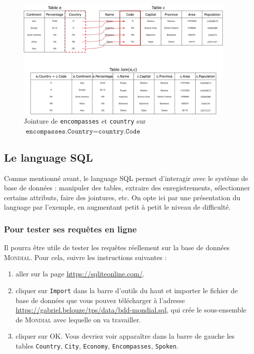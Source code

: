 \begin{figure}[h]
	\begin{center}
		\includegraphics[width=0.95\textwidth]{figures/12/bddr-mondial.png}
	\end{center}
	\caption{Jointure de \texttt{encompasses} et \texttt{country} sur $ \texttt{encompasses.Country} = \texttt{country.Code} $ }
	\label{fig:jointure}
\end{figure}


\subsection{Le language SQL}

Comme mentionné avant, le language SQL permet d'interagir avec le système de base de données : manipuler des tables, extraire des enregistrements, sélectionner certains attributs, faire des jointures, etc. On opte ici par une présentation du language par l'exemple, en augmentant petit à petit le niveau de difficulté.

\subsubsection*{Pour tester ses requêtes en ligne}

Il pourra être utile de tester les requêtes réellement sur la base de données \textsc{Mondial}. Pour cela, suivre les instructions suivantes :
\begin{enumerate}
	\item aller sur la page \href{https://sqliteonline.com/}{https://sqliteonline.com/}.
	\item cliquer sur \texttt{Import} dans la barre d'outils du haut et importer le fichier de base de données que vous pouvez télécharger à l'adresse \href{https://gabriel.belouze/tps/data/bdd-mondial.sql}{https://gabriel.belouze/tps/data/bdd-mondial.sql}, qui crée le sous-ensemble de \textsc{Mondial} avec lequelle on va travailler.
	\item  cliquer sur OK. Vous devriez voir apparaître dans la barre de gauche les tables \texttt{Country}, \texttt{City}, \texttt{Economy}, \texttt{Encompasses}, \texttt{Spoken}.
\end{enumerate}

